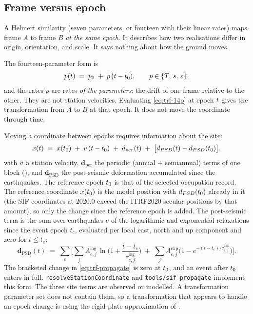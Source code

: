 \documentclass[main.tex]{subfiles}
\begin{document}
\subsection{Frame versus epoch}\label{sec:trf-rule}

A Helmert similarity (seven parameters, or fourteen with their linear
rates) maps frame $A$ to frame $B$ \emph{at the same epoch}.  It
describes how two realisations differ in origin, orientation, and
scale.  It says nothing about how the ground moves.

The fourteen-parameter form is
\begin{equation}
p(t) \;=\; p_0 \;+\; \dot{p}\,(t-t_0),
\qquad p \in \{T,\,s,\,\varepsilon\},
\label{eq:trf-14p}
\end{equation}
and the rates $\dot{p}$ are rates \emph{of the parameters}: the drift of
one frame relative to the other.  They are not station velocities.
Evaluating \eqref{eq:trf-14p} at epoch $t$ gives the transformation
from $A$ to $B$ at that epoch.  It does not move the coordinate through
time.

Moving a coordinate between epochs requires information about the site:
\begin{equation}
x(t) \;=\; x(t_0) \;+\; v\,(t-t_0)
              \;+\; d_{per}(t)
              \;+\; \bigl[d_{PSD}(t)-d_{PSD}(t_0)\bigr],
\label{eq:trf-propagate}
\end{equation}
with $v$ a station velocity, $\bm{d}_{\mathrm{per}}$ the periodic
(annual $+$ semiannual) terms of one block (), and
$\bm{d}_{\mathrm{PSD}}$ the post-seismic deformation accumulated since
the earthquakes.  The reference epoch $t_0$ is that of the selected
occupation record.  The reference
coordinate $x(t_0)$ is the model position with
$d_{PSD}(t_0)$ already in it (the SIF coordinates at
$2020.0$ exceed the ITRF2020 secular positions by that amount), so only the
change since the reference epoch is added.  The post-seismic term is the
sum over earthquakes $e$ of the logarithmic and exponential relaxations
since the event epoch $t_e$, evaluated per local east, north and up
component and zero for $t \le t_e$:
\begin{equation}
\bm{d}_{\mathrm{PSD}}(t) \;=\; \sum_{e}\Big[\sum_{j}A^{\log}_{e,j}\,
   \ln\!\Big(1+\frac{t-t_e}{\tau^{\log}_{e,j}}\Big)
 \;+\;\sum_{j}A^{\exp}_{e,j}\Big(1-e^{-(t-t_e)/\tau^{\exp}_{e,j}}\Big)\Big].
\label{eq:trf-psd}
\end{equation}
The bracketed change in \eqref{eq:trf-propagate} is zero at $t_0$, and
an event after $t_0$ enters in full.
\texttt{resolveStation\allowbreak Coordinate} and
\texttt{tools/sif\_\allowbreak propagate} implement this form.  The three site terms
are observed or modelled.  A transformation parameter set does not
contain them, so a transformation that appears to handle an epoch
change is using the rigid-plate approximation of .
\end{document}
